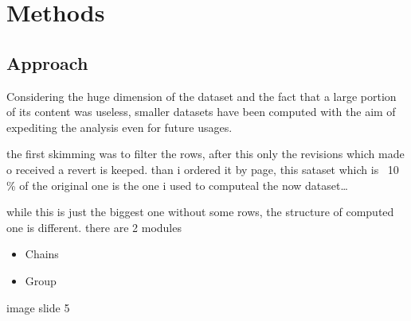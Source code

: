 \chapter{Methods}

\section{Approach}
Considering the huge dimension of the dataset and the fact that a large portion of its content was useless, 
smaller datasets have been computed with the aim of expediting the analysis even for future usages.

the first skimming was to filter the rows, after this only the revisions which made o received a revert is keeped.
than i ordered it by page, this sataset which is ~10 \% of the original one is the one i used to computeal the now dataset\dots

while this is just the biggest one without some rows, the structure of computed one is different. there are 2 modules
\begin{itemize}
    \item Chains
    \item Group 
\end{itemize}

image slide 5 

